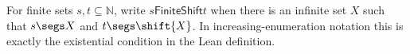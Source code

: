 \begin{definition}
For finite sets $s,t\subseteq\mathbb N$, write $s\mathrel{\mathsf{FiniteShift}}t$
when there is an infinite set $X$ such that $s\segs X$ and
$t\segs\shift{X}$.  In increasing-enumeration notation this is exactly the
existential condition in the Lean definition.
\end{definition}
